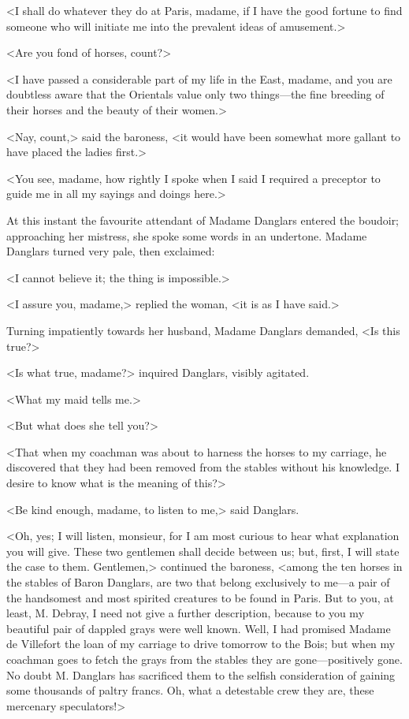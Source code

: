  <I shall do whatever they do at Paris, madame, if I have the good fortune to find someone who will initiate me into the prevalent ideas of amusement.> 

 <Are you fond of horses, count?> 

 <I have passed a considerable part of my life in the East, madame, and you are doubtless aware that the Orientals value only two things—the fine breeding of their horses and the beauty of their women.> 

 <Nay, count,> said the baroness, <it would have been somewhat more gallant to have placed the ladies first.> 

 <You see, madame, how rightly I spoke when I said I required a preceptor to guide me in all my sayings and doings here.> 

 At this instant the favourite attendant of Madame Danglars entered the boudoir; approaching her mistress, she spoke some words in an undertone. Madame Danglars turned very pale, then exclaimed: 

 <I cannot believe it; the thing is impossible.> 

 <I assure you, madame,> replied the woman, <it is as I have said.> 

 Turning impatiently towards her husband, Madame Danglars demanded, <Is this true?> 

 <Is what true, madame?> inquired Danglars, visibly agitated. 

 <What my maid tells me.> 

 <But what does she tell you?> 

 <That when my coachman was about to harness the horses to my carriage, he discovered that they had been removed from the stables without his knowledge. I desire to know what is the meaning of this?> 

 <Be kind enough, madame, to listen to me,> said Danglars. 

 <Oh, yes; I will listen, monsieur, for I am most curious to hear what explanation you will give. These two gentlemen shall decide between us; but, first, I will state the case to them. Gentlemen,> continued the baroness, <among the ten horses in the stables of Baron Danglars, are two that belong exclusively to me—a pair of the handsomest and most spirited creatures to be found in Paris. But to you, at least, M. Debray, I need not give a further description, because to you my beautiful pair of dappled grays were well known. Well, I had promised Madame de Villefort the loan of my carriage to drive tomorrow to the Bois; but when my coachman goes to fetch the grays from the stables they are gone—positively gone. No doubt M. Danglars has sacrificed them to the selfish consideration of gaining some thousands of paltry francs. Oh, what a detestable crew they are, these mercenary speculators!> 

